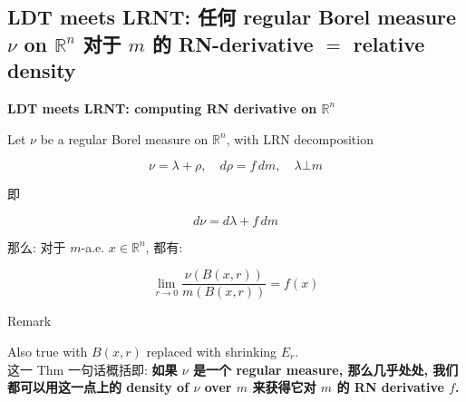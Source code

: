 \documentclass{qlnotes-export}
\begin{document}
\subsection{\texorpdfstring{LDT meets LRNT: 任何 regular Borel measure \(\nu\) on \({\mathbb{R}}^{n}\) 对于 \(m\) 的 RN-derivative \(=\) relative density}{LDT meets LRNT: 任何 regular Borel measure \textbackslash nu on \{\textbackslash mathbb\{R\}\}\^{}\{n\} 对于 m 的 RN-derivative = relative density}}\label{ldt-meets-lrnt-ux4efbux4f55-regular-borel-measure-nu-on-mathbbrn-ux5bf9ux4e8e-m-ux7684-rn-derivative-relative-density}

\begin{theorem}{\protect{}\label{kn-ldt-meets-lrnt-computing-rn-derivative-on-mathbb-r-n}{\textbf{LDT
meets LRNT: computing RN derivative on \({\mathbb{R}}^{n}\)}}}

Let \(\nu\) be a regular Borel measure on \({\mathbb{R}}^{n}\), with LRN decomposition

\[\nu = \lambda + \rho,\quad d\rho = f\, dm,\quad\lambda\bot m\]

即

\[d\nu = d\lambda + f\, dm\]

那么: 对于 \(m\)-a.e. \(x \in {\mathbb{R}}^{n}\), 都有:

\[\lim\limits_{r\rightarrow 0}\frac{\nu(B(x,r))}{m(B(x,r))} = f(x)\]

\end{theorem}

\begin{qlremark}{Remark}

Also true with \(B(x,r)\) replaced with shrinking \(E_{r}\).\\
这一 Thm 一句话概括即: \textbf{如果 \(\nu\) 是一个 regular measure, 那么几乎处处, 我们都可以用这一点上的 density of \(\nu\) over \(m\) 来获得它对 \(m\) 的 RN derivative \(f\).}

\end{qlremark}
\end{document}
